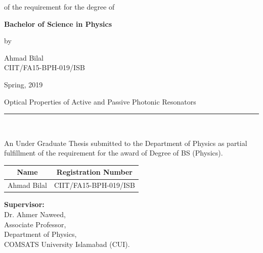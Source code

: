 \documentclass[12pt,twoside]{report}
\begin{document}
	\begin{center}
		{of the requirement for the degree of}
	\end{center}
	
	\vspace{0.5 in}
	
	\begin{center}
		{\Large {\textbf{Bachelor of Science in Physics}} }
	\end{center}
	
	\vspace{0.5 in}
	\begin{center}
		{by }
	\end{center}
	\begin{center}
		{\large {Ahmad Bilal\\[0pt]
				CIIT/FA15-BPH-019/ISB\\[0pt]
		}}
	\end{center}
	\vspace{0.5 in}
	\begin{center}
		Spring, 2019
	\end{center}
	\newpage
	\begin{center}
{\Large {Optical Properties of Active and Passive Photonic Resonators}\\[0pt]
		\noindent\rule{18cm}{3pt}} \\
\end{center}
\vspace{0.2 in} 
		An Under Graduate Thesis submitted to the Department of Physics as partial fulfillment of the requirement for the award of Degree of BS (Physics). 
\vspace{0.5 in}
\begin{center}
	\begin{tabular}{ | c| c | }
			\hline
			Name &  Registration Number \\
			\hline
		Ahmad Bilal & CIIT/FA15-BPH-019/ISB \\ 
			\hline
	\end{tabular}
\end{center}
	\vspace{3 in}
	\textbf {Supervisor:}\\
	Dr. Ahmer Naweed,\\
	Associate Professor,\\
	Department of Physics,\\
	COMSATS University Islamabad (CUI).\\
	\newpage
	
\end{document}
